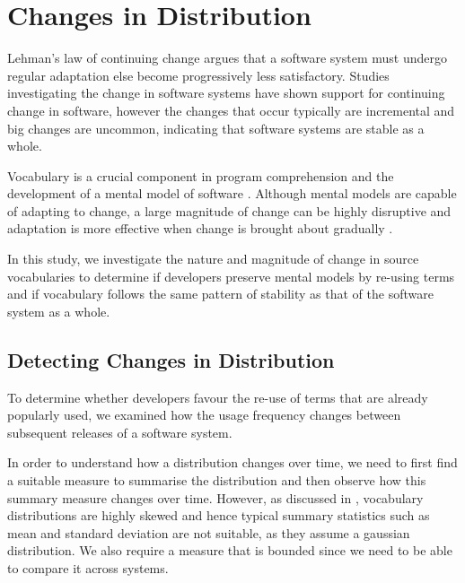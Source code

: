 

\section{Changes in Distribution} %
\label{sec:changes_in_distribution}

Lehman's law of continuing change \cite{Lehman97a} argues that a software system must undergo regular adaptation else become progressively less satisfactory. Studies investigating the change in software systems \cite{Vasa09a, Vasa10a} have shown support for continuing change in software, however the changes that occur typically are incremental and big changes are uncommon, indicating that software systems are stable as a whole.

Vocabulary is a crucial component in program comprehension and the development of a mental model of software \cite{Littman87a}. Although mental models are capable of adapting to change, a large magnitude of change can be highly disruptive and adaptation is more effective when change is brought about gradually \cite{Levesque01a}.

In this study, we investigate the nature and magnitude of change in source vocabularies to determine if developers preserve mental models by re-using terms and if vocabulary follows the same pattern of stability as that of the software system as a whole.

\subsection{Detecting Changes in Distribution} %
\label{sub:detecting_changes_in_distribution}

To determine whether developers favour the re-use of terms that are already popularly used, we examined how the usage frequency changes between subsequent releases of a software system.

In order to understand how a distribution changes over time, we need to first find a suitable measure to summarise the distribution and then observe how this summary measure changes over time. However, as discussed in , vocabulary distributions are highly skewed and hence typical summary statistics such as mean and standard deviation are not suitable, as they assume a gaussian distribution. We also require a measure that is bounded since we need to be able to compare it across systems.


